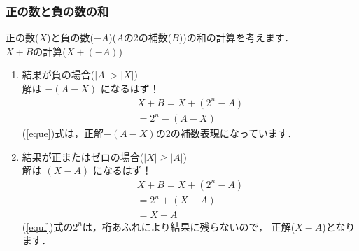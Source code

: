 \subsubsection{正の数と負の数の和}
正の数($X$)と負の数($-A$)($A$の2の補数($B$))の和の計算を考えます．\\
$X + B$の計算($X + (-A)$)
\begin{enumerate}
\item 結果が負の場合($|A| > |X|$)\\
解は $-(A - X)$ になるはず！
{\small
\begin{eqnarray}
X + B = X + (2^n - A) \nonumber \\
      = 2^n - (A - X) \label{eque}
\end{eqnarray}
}
(\ref{eque})式は，正解$-(A - X)$の2の補数表現になっています．


\item 結果が正またはゼロの場合($|X| \geq |A|$)\\
解は $(X - A)$ になるはず！
{\small
\begin{eqnarray}
X + B = X + (2^n - A) \nonumber \\
      = 2^n + (X - A) \label{equf} \\
      = X - A         \nonumber
\end{eqnarray}
}
(\ref{equf})式の$2^n$は，桁あふれにより結果に残らないので，
正解($X - A$)となります．

\end{enumerate}

